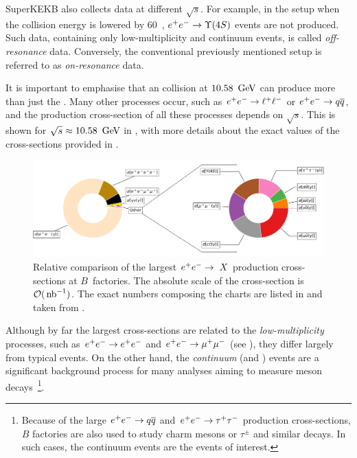 SuperKEKB also collects data at different $\sqrt{s}$.
For example, in the setup when the collision energy is lowered by 60~\mev, $\epem\ra\FourS$ events are not produced.
Such data, containing only low-multiplicity and continuum events, is called \textit{off-resonance} data.
Conversely, the conventional previously mentioned setup is referred to as \textit{on-resonance} data.

It is important to emphasise that an \epem collision at $10.58~\mathrm{\,Ge\kern -0.1em V}$ can produce more than just the \FourS.
Many other processes occur, such as $e^+e^-\rightarrow\ell^+\ell^-$ or $e^+e^-\rightarrow q\overline q$, and the production 
cross-section of all these processes depends on $\sqrt{s}$.
This is shown for $\sqrt{s}\approx10.58~\mathrm{\,Ge\kern -0.1em V}$ in , with more details about the exact values of the cross-sections provided in .
\begin{figure}[htbp!]
    \includegraphics[width=1\textwidth]{figures/experimental_setup/corss_sections.pdf}
    \caption{\label{fig:cross_sections} Relative comparison of the largest $e^+e^-\rightarrow\ X$ production cross-sections at $B$~factories.
    The absolute scale of the cross-section is ${\cal O}({\rm \,nb}^{-1})$.
    The exact numbers composing the charts are listed in  and taken from \cite{Belle-II:2018jsg}.
    }
\end{figure}

Although by far the largest cross-sections are related to the \textit{low-multiplicity} processes, 
such as $e^+e^-\rightarrow e^+e^-$ and $e^+e^-\rightarrow\mu^+\mu^-$ (see ),
they differ largely from typical \FourS\ra\BB events.
On the other hand, the \textit{continuum} (\epem\ra\qqbar and \epem\ra\tautau) 
events are a significant background process for many analyses aiming to measure \B meson decays~\footnote{Because of the large $e^+e^-\rightarrow q\overline q$ and $e^+e^-\rightarrow\tau^+\tau^-$ production cross-sections, 
$B$ factories are also used to study charm mesons or $\tau^{\pm}$ and similar decays. 
In such cases, the continuum events are the events of interest.}.

